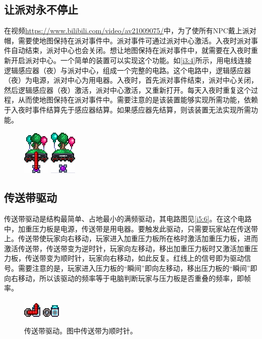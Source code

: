 \subsection{让派对永不停止}

在视频\url{https://www.bilibili.com/video/av21009075/}中，为了使所有NPC戴上派对帽，需要使地图保持在派对事件中。派对事件可通过派对中心激活。入夜时派对事件自动结束，派对中心也会关闭。想让地图保持在派对事件中，就需要在入夜时重新开启派对中心。一个简单的装置可以实现这个功能。如\autoref{i3:4}所示，用电线连接逻辑感应器（夜）与派对中心，组成一个完整的电路。这个电路中，逻辑感应器（夜）为电源，派对中心为用电器。入夜时，首先派对事件结束，派对中心关闭，然后逻辑感应器（夜）激活，派对中心激活，又重新打开。每天入夜时重复这个过程，从而使地图保持在派对事件中。需要注意的是该装置能够实现所需功能，依赖于入夜时事件结算先于感应器结算。如果感应器先结算，则该装置无法实现所需功能。

\begin{figure}[!h]
\begin{center}
\includegraphics{images/3.png}
\qquad
\includegraphics{images/4.png}
\end{center}
\caption{}
\label{i3:4}
\end{figure}

\subsection{传送带驱动}

传送带驱动是结构最简单、占地最小的满频驱动，其电路图见\autoref{i5:6}。在这个电路中，加重压力板是电源，传送带是用电器。要触发此驱动，只需要玩家站在传送带上。传送带使玩家向右移动，玩家进入加重压力板所在格时激活加重压力板，进而激活传送带，传送带变为逆时针，玩家向左移动，移出加重压力板时又激活加重压力板，传送带变为顺时针，玩家向右移动，如此反复。红线上的信号即为驱动信号。需要注意的是，玩家进入压力板的“瞬间”即向左移动，移出压力板的“瞬间”即向右移动，所以该驱动的频率等于电脑判断玩家与压力板是否重叠的频率，即帧率。

\begin{figure}[!ht]
\begin{center}
\includegraphics{images/5.png}
\qquad
\includegraphics{images/6.png}
\end{center}
\caption{传送带驱动。图中传送带为顺时针。}
\label{i5:6}
\end{figure}

